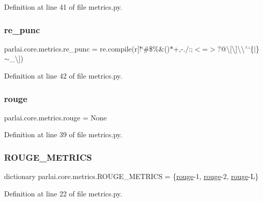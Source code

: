 Definition at line 41 of file metrics.\+py.

\mbox{\label{namespaceparlai_1_1core_1_1metrics_a334cb58cda231eb62dea1fd375f8d687}} 
\subsubsection{\texorpdfstring{re\+\_\+punc}{re\_punc}}
{\footnotesize\ttfamily parlai.\+core.\+metrics.\+re\+\_\+punc = re.\+compile(r\textquotesingle{}\mbox{[}!\char`\"{}\#\$\%\&()$\ast$+,-\/./\+:;$<$=$>$?@\textbackslash{}\mbox{[}\textbackslash{}\mbox{]}\textbackslash{}\textbackslash{}$^\wedge$`\{$\vert$\}$\sim$\+\_\+\textbackslash{}\textquotesingle{}\mbox{]}\textquotesingle{})}



Definition at line 42 of file metrics.\+py.

\mbox{\label{namespaceparlai_1_1core_1_1metrics_ae0fddd2325f5dc52b2a367e52056242a}} 
\subsubsection{\texorpdfstring{rouge}{rouge}}
{\footnotesize\ttfamily parlai.\+core.\+metrics.\+rouge = None}



Definition at line 39 of file metrics.\+py.

\mbox{\label{namespaceparlai_1_1core_1_1metrics_ac01c4a05e91baee81e771e8f7ae9e7e4}} 
\subsubsection{\texorpdfstring{R\+O\+U\+G\+E\+\_\+\+M\+E\+T\+R\+I\+CS}{ROUGE\_METRICS}}
{\footnotesize\ttfamily dictionary parlai.\+core.\+metrics.\+R\+O\+U\+G\+E\+\_\+\+M\+E\+T\+R\+I\+CS = \{\textquotesingle{}\hyperlink{namespaceparlai_1_1core_1_1metrics_ae0fddd2325f5dc52b2a367e52056242a}{rouge}-\/1\textquotesingle{}, \textquotesingle{}\hyperlink{namespaceparlai_1_1core_1_1metrics_ae0fddd2325f5dc52b2a367e52056242a}{rouge}-\/2\textquotesingle{}, \textquotesingle{}\hyperlink{namespaceparlai_1_1core_1_1metrics_ae0fddd2325f5dc52b2a367e52056242a}{rouge}-\/L\textquotesingle{}\}}



Definition at line 22 of file metrics.\+py.

